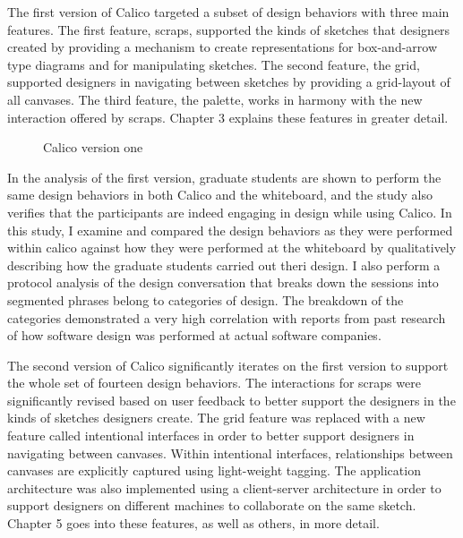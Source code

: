 The first version of Calico targeted a subset of design behaviors with three main features. The first feature, scraps, supported the kinds of sketches that designers created by providing a mechanism to create representations for box-and-arrow type diagrams and for manipulating sketches. The second feature, the grid, supported designers in navigating between sketches by providing a grid-layout of all canvases. The third feature, the palette, works in harmony with the new interaction offered by scraps. Chapter 3 explains these features in greater detail.

\begin{figure}
  \centering
   \caption {Calico version one}
   \label{fig:calico-version-one}
\end{figure}

In the analysis of the first version, graduate students are shown to perform the same design behaviors in both Calico and the whiteboard, and the study also verifies that the participants are indeed engaging in design while using Calico. In this study, I examine and compared the design behaviors as they were performed within calico against how they were performed at the whiteboard by qualitatively describing how the graduate students carried out theri design. I also perform a protocol analysis of the design conversation that breaks down the sessions into segmented phrases belong to categories of design. The breakdown of the categories demonstrated a very high correlation with reports from past research of how software design was performed at actual software companies.

The second version of Calico significantly iterates on the first version to support the whole set of fourteen design behaviors. The interactions for scraps were significantly revised based on user feedback to better support the designers in the kinds of sketches designers create. The grid feature was replaced with a new feature called intentional interfaces in order to better support designers in navigating between canvases. Within intentional interfaces, relationships between canvases are explicitly captured using light-weight tagging. The application architecture was also implemented using a client-server architecture in order to support designers on different machines to collaborate on the same sketch. Chapter 5 goes into these features, as well as others, in more detail.

